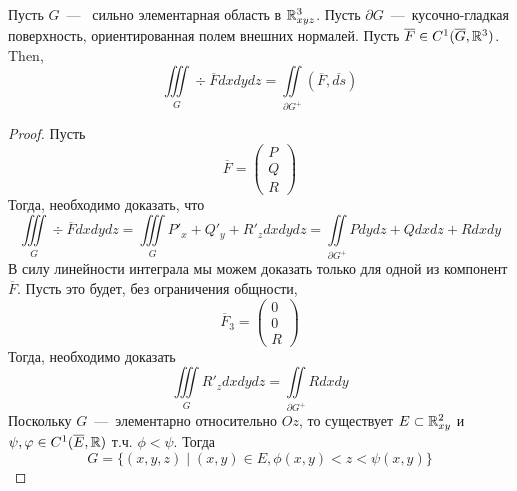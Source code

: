 \begin{theorem}
    Пусть $G$~---~ сильно элементарная область в $\mathbb{R}^3_{xyz}$. Пусть $\partial G$~---~кусочно-гладкая поверхность, ориентированная полем внешних нормалей. Пусть $\overline{F} \in C^1(\overline{G}, \mathbb{R}^3)$. Then, \[\iiint\limits_{G} \div \overline{F} dxdydz = \iint\limits_{\partial G^+} (\overline{F}, \overline{ds})\]
\end{theorem}
\begin{proof}
    Пусть \[\overline{F} = \begin{pmatrix}
        P \\ Q \\ R
    \end{pmatrix}\]
    Тогда, необходимо доказать, что \[\iiint\limits_G \div \overline{F} dxdydz = \iiint\limits_G P'_x + Q'_y + R'_z dxdydz = \iint\limits_{\partial G^+} Pdydz + Qdxdz + Rdxdy\]
    В силу линейности интеграла мы можем доказать только для одной из компонент $\overline{F}$. Пусть это будет, без ограничения общности, \[\overline{F}_3 = \begin{pmatrix}
        0 \\ 0 \\ R
    \end{pmatrix}\]
    Тогда, необходимо доказать \[\iiint\limits_G R'_z dxdydz = \iint\limits_{\partial G^+} Rdxdy\]
    Поскольку $G$~---~элементарно относительно $Oz$, то существует $E \subset \mathbb{R}^2_{xy}$ и $\psi, \varphi \in C^1(\overline{E}, \mathbb{R})$ т.ч. $\phi < \psi$. Тогда \[G = \{(x, y, z) \mid (x, y) \in E, \phi(x, y) < z < \psi(x, y)\}\]


\end{proof}
